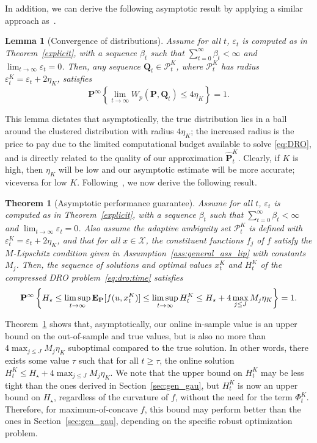 \documentclass[12pt]{article}
\newcommand{\prob}{{\mathbf P}}
\newcommand{\Expect}{{\mbox{\bf E}}}
\newcommand{\unc}{u}
\newcommand{\eps}{\varepsilon^K}
\newcommand{\epsnom}{\varepsilon}
\newtheorem{theorem}{Theorem}[section]  %
\newtheorem{lemma}{Lemma}[section]  %
\begin{document}
In addition, we can derive the following asymptotic result by applying a similar approach as~\cite[Lemma 3.7]{mohajerin2018data}.

\begin{lemma}[Convergence of distributions]\label{lemma:convergence:K}
Assume for all $t$, $\epsnom_t$ is computed as in Theorem~\ref{explicit}, with a sequence $\beta_t$ such that $\sum_{t=0}^\infty \beta_t< \infty$ and $\lim_{t\to\infty}\epsnom_t = 0$. Then, any sequence $\mathbf{Q}_t \in \mathcal{P}^K_t$, where $\mathcal{P}^K_t$ has radius $\eps_t = \epsnom_t + 2\eta_K$, satisfies
$$
\mathbf{P}^\infty\left\{ \lim_{t \rightarrow \infty } W_p(\mathbf{P}, \mathbf{Q}_t) \leq 4\eta_K\right\} = 1.
$$ 
\end{lemma}

This lemma dictates that asymptotically, the true distribution lies in a ball around the clustered distribution with radius $4\eta_K$; the increased radius is the price to pay due to the limited computational budget available to solve \eqref{eq:DRO}, and is directly related to the quality of our approximation $\hat{\prob}^K_t$. Clearly, if $K$ is high, then $\eta_K$ will be low and our asymptotic estimate will be more accurate; viceversa for low $K$.
Following~\cite[Theorem 3.6]{mohajerin2018data}, we now derive the following result. 

\begin{theorem}[Asymptotic performance guarantee] 
\label{thm:asy_eta}
Assume for all $t$, $\epsnom_t$ is computed as in Theorem~\ref{explicit}, with a sequence $\beta_t$ such that $\sum_{t=0}^\infty \beta_t< \infty$ and $\lim_{t\to\infty}\epsnom_t = 0$. Also assume the adaptive ambiguity set $\mathcal{P}^K_t$ is defined with $\eps_{t} = \epsnom_{t} + 2\eta_K$, and that for all $x\in \mathcal{X}$, the constituent functions $f_j$ of $f$ satisfy the $M$-Lipschitz condition given in Assumption~\ref{ass:general_ass_lip} with constants $M_j$.
Then, the sequence of solutions and optimal values $x^K_{t}$ and $H^K_t$ of the compressed \gls{DRO} problem~\eqref{eq:dro:time} satisfies
$$\mathbf{P}^\infty\left\{ H_\star \leq \limsup_{t \rightarrow \infty } \Expect_\prob[f(\unc,x^K_{t})]\leq \limsup_{t \rightarrow \infty } H^K_t \leq H_\star + 4\max_{j\leq J}M_j\eta_K\right\} = 1.
$$
\end{theorem}

Theorem~\ref{thm:asy_eta} shows that, asymptotically, our online in-sample value is an upper bound on the out-of-sample and true values, but is also no more than $4\max_{j\leq J}M_j\eta_K$ suboptimal compared to the true solution. In other words, there exists some value $\tau$ such that for all $t \geq \tau$, the online solution $H^K_t \leq H_\star + 4\max_{j\leq J}M_j\eta_K$.
We note that the upper bound on $H^K_t$ may be less tight than the ones derived in Section~\ref{sec:gen_gau}, but $H^K_t$ is now an upper bound on $H_\star$, regardless of the curvature of $f$, without the need for the term $\Phi^K_t$. Therefore, for maximum-of-concave $f$, this bound may perform better than the ones in Section~\ref{sec:gen_gau}, depending on the specific robust optimization problem. 
\end{document}
